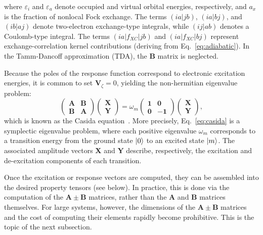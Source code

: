 \documentclass[%
 aip,
 amsmath,amssymb,
preprint,%
]{revtex4-2}
\begin{document}
where $\varepsilon_i$ and $\varepsilon_a$ denote occupied and virtual orbital energies, respectively, and $a_x$ is the fraction of nonlocal Fock exchange. 
The terms $(ia|jb)$, $(ia|bj)$, and $(ib|aj)$ denote two-electron exchange-type integrals, while $(ij|ab)$ denotes a Coulomb-type integral. 
The terms $(ia|f_{XC}|jb)$ and $(ia|f_{XC}|bj)$ represent exchange-correlation kernel contributions (deriving from Eq.~\eqref{eq:adiabatic}). 
In the Tamm-Dancoff approximation (TDA),\cite{hirataTimedependentDensityFunctional1999} the $\mathbf{B}$ matrix is neglected.

Because the poles of the response function correspond to electronic excitation energies, it is common to set $\mathbf{V}_\zeta = 0$, yielding the non-hermitian eigenvalue problem:
\begin{equation}
	\begin{pmatrix}
		\mathbf{A} & \mathbf{B} \\
		\mathbf{B} & \mathbf{A}
	\end{pmatrix}
	\begin{pmatrix}
		\mathbf{X} \\
		\mathbf{Y}
	\end{pmatrix}
	=
	\omega_m
	\begin{pmatrix}
		\mathbf{1} & \mathbf{0} \\
		\mathbf{0} & -\mathbf{1}
	\end{pmatrix}
	\begin{pmatrix}
		\mathbf{X} \\
		\mathbf{Y}
	\end{pmatrix},
	\label{eq:casida}
\end{equation}
which is known as the Casida equation~\cite{casidaTimeDependentDensityFunctional1995}. 
More precisely, Eq.~\eqref{eq:casida} is a symplectic eigenvalue problem,\cite{kauczorEfficiencyAlgorithmsSolving2011,furcheAcceleratingMolecularProperty2016} where each positive eigenvalue $\omega_m$ corresponds to a transition energy from the ground state $\ket{0}$ to an excited state $\ket{m}$. 
The associated amplitude vectors $\mathbf{X}$ and $\mathbf{Y}$ describe, respectively, the excitation and de-excitation components of each transition.

Once the excitation or response vectors are computed, they can be assembled into the desired property tensors (see below). 
In practice, this is done via the computation of the $\mathbf A \pm \mathbf B$ matrices, rather than the $\mathbf A$ and $\mathbf B$ matrices themselves.\cite{casidaTimeDependentDensityFunctional1995,bannwarthSimplifiedTimedependentDensity2014,furcheAcceleratingMolecularProperty2016,parkerQuadraticResponseProperties2018}
For large systems, however, the dimensions of the $\mathbf{A} \pm \mathbf{B}$ matrices and the cost of computing their elements rapidly become prohibitive.
This is the topic of the next subsection.
\end{document}
